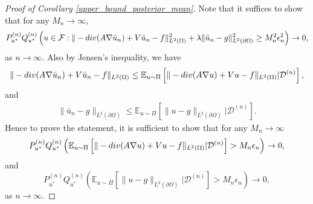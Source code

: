 \documentclass[10pt,a4paper]{amsart}
\newcommand{\D}{\mathcal{D}}
\newcommand{\E}{\mathbb{E}}
\newcommand{\F}{\mathcal{F}}
\renewcommand{\div}{\textnormal{div}}
\begin{document}
\begin{proof}[Proof of Corollary \ref{upper_bound_posterior_mean}]
    Note that it suffices to show that for any $M_n \to \infty$,
    \begin{align*}
        P_{u^*}^{(n)} Q_{u^*}^{(n)} \left(u \in \F: \|-\div(A \nabla \bar{u}_n ) + V \bar{u}_n  -f\|_{L^2(\Omega)}^2 + \lambda \|\bar{u}_n - g\|_{L^2(\partial \Omega)}^2 \geq M_n^2 \epsilon_n^2\right) \to 0,
    \end{align*}
    as $n \to \infty$. 
    Also by Jensen's inequality, we have
    \begin{align*}
         \|-\div(A \nabla \bar{u}_n ) + V \bar{u}_n  -f\|_{L^2(\Omega)} \leq \E_{u \sim \Pi} \left[ \|-\div(A \nabla u) + V u -f\|_{L^2(\Omega)} | \D^{(n)}\right], 
    \end{align*}
    and 
    \begin{align*}
        \|\bar{u}_n - g\|_{L^2(\partial \Omega)} \leq \E_{u \sim \Pi} \left[\|u -g\|_{L^2(\partial \Omega)} | \D^{(n)}\right]. 
    \end{align*}
    Hence to prove the statement, it is sufficient to show that for any $M_n \to \infty$
    \begin{equation} \label{posterior_mean_domain}
         P_{u^*}^{(n)} Q_{u^*}^{(n)} \left( \E_{u \sim \Pi} \left[ \|-\div(A \nabla u) + V u -f\|_{L^2(\Omega)} | \D^{(n)}\right] > M_n \epsilon_n \right) \to 0,
    \end{equation}
    and 
    \begin{equation} \label{posterior_mean_boundary}
        P_{u^*}^{(n)} Q_{u^*}^{(n)} \left(\E_{u \sim \Pi} \left[\|u -g\|_{L^2(\partial \Omega)} | \D^{(n)}\right] > M_n \epsilon_n \right) \to 0,
    \end{equation}
    as $n \to \infty$.
    

\end{proof}
\end{document}
